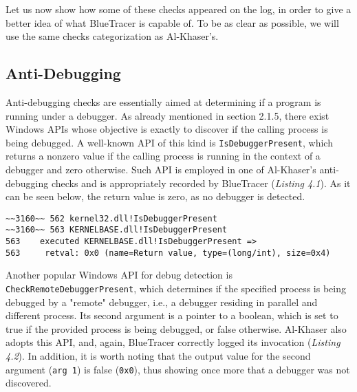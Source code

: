 Let us now show how some of these checks appeared on the log, in order to give a better idea of what BlueTracer is capable of. To be as clear as possible, we will use the same checks categorization as Al-Khaser's.

\subsection{Anti-Debugging}

Anti-debugging checks are essentially aimed at determining if a program is running under a debugger. As already mentioned in section 2.1.5, there exist Windows APIs whose objective is exactly to discover if the calling process is being debugged.
A well-known API of this kind is \texttt{IsDebuggerPresent}, which returns a nonzero value if the calling process is running in the context of a debugger and zero otherwise. Such API is employed in one of Al-Khaser's anti-debugging checks and is appropriately recorded by BlueTracer (\textit{Listing 4.1}). As it can be seen below, the return value is zero, as no debugger is detected.

\vspace{0.5cm}
\begin{lstlisting}[caption={Log entry relative to \texttt{IsDebuggerPresent}},captionpos=b]
~~3160~~ 562 kernel32.dll!IsDebuggerPresent
~~3160~~ 563 KERNELBASE.dll!IsDebuggerPresent
563    executed KERNELBASE.dll!IsDebuggerPresent =>
563 	retval: 0x0 (name=Return value, type=(long/int), size=0x4)
\end{lstlisting}

Another popular Windows API for debug detection is \texttt{CheckRemoteDebuggerPresent}, which determines if the specified process is being debugged by a "remote" debugger, i.e., a debugger residing in parallel and different process. Its second argument is a pointer to a boolean, which is set to true if the provided process is being debugged, or false otherwise. Al-Khaser also adopts this API, and, again, BlueTracer correctly logged its invocation (\textit{Listing 4.2}). In addition, it is worth noting that the output value for the second argument (\texttt{arg 1}) is 
false (\texttt{0x0}), thus showing once more that a debugger was not discovered.   

